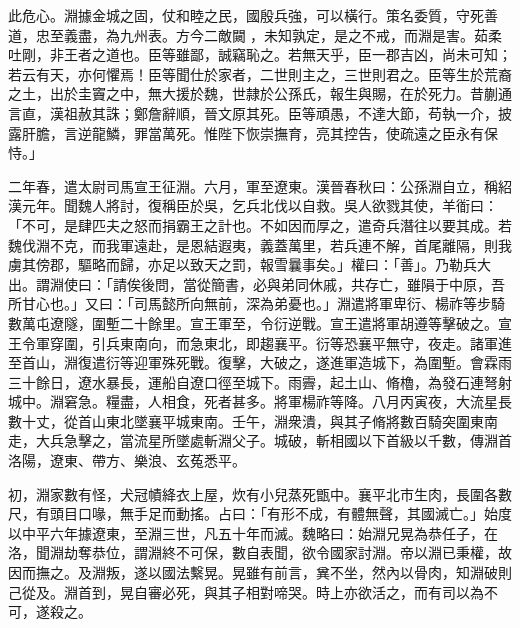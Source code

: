 \begin{pinyinscope}
此危心。淵據金城之固，仗和睦之民，國殷兵強，可以橫行。策名委質，守死善道，忠至義盡，為九州表。方今二敵闚𨵦，未知孰定，是之不戒，而淵是害。茹柔吐剛，非王者之道也。臣等雖鄙，誠竊恥之。若無天乎，臣一郡吉凶，尚未可知；若云有天，亦何懼焉！臣等聞仕於家者，二世則主之，三世則君之。臣等生於荒裔之土，出於圭竇之中，無大援於魏，世隷於公孫氏，報生與賜，在於死力。昔蒯通言直，漢祖赦其誅；鄭詹辭順，晉文原其死。臣等頑愚，不達大節，苟執一介，披露肝膽，言逆龍鱗，罪當萬死。惟陛下恢崇撫育，亮其控告，使疏遠之臣永有保恃。」

二年春，遣太尉司馬宣王征淵。六月，軍至遼東。漢晉春秋曰：公孫淵自立，稱紹漢元年。聞魏人將討，復稱臣於吳，乞兵北伐以自救。吳人欲戮其使，羊衜曰：「不可，是肆匹夫之怒而捐霸王之計也。不如因而厚之，遣奇兵潛往以要其成。若魏伐淵不克，而我軍遠赴，是恩結遐夷，義蓋萬里，若兵連不解，首尾離隔，則我虜其傍郡，驅略而歸，亦足以致天之罰，報雪曩事矣。」權曰：「善」。乃勒兵大出。謂淵使曰：「請俟後問，當從簡書，必與弟同休戚，共存亡，雖隕于中原，吾所甘心也。」又曰：「司馬懿所向無前，深為弟憂也。」淵遣將軍卑衍、楊祚等步騎數萬屯遼隧，圍塹二十餘里。宣王軍至，令衍逆戰。宣王遣將軍胡遵等擊破之。宣王令軍穿圍，引兵東南向，而急東北，即趨襄平。衍等恐襄平無守，夜走。諸軍進至首山，淵復遣衍等迎軍殊死戰。復擊，大破之，遂進軍造城下，為圍塹。會霖雨三十餘日，遼水暴長，運船自遼口徑至城下。雨霽，起土山、脩櫓，為發石連弩射城中。淵窘急。糧盡，人相食，死者甚多。將軍楊祚等降。八月丙寅夜，大流星長數十丈，從首山東北墜襄平城東南。壬午，淵衆潰，與其子脩將數百騎突圍東南走，大兵急擊之，當流星所墜處斬淵父子。城破，斬相國以下首級以千數，傳淵首洛陽，遼東、帶方、樂浪、玄菟悉平。

初，淵家數有怪，犬冠幘絳衣上屋，炊有小兒蒸死甑中。襄平北巿生肉，長圍各數尺，有頭目口喙，無手足而動搖。占曰：「有形不成，有體無聲，其國滅亡。」始度以中平六年據遼東，至淵三世，凡五十年而滅。魏略曰：始淵兄晃為恭任子，在洛，聞淵劫奪恭位，謂淵終不可保，數自表聞，欲令國家討淵。帝以淵已秉權，故因而撫之。及淵叛，遂以國法繫晃。晃雖有前言，兾不坐，然內以骨肉，知淵破則己從及。淵首到，晃自審必死，與其子相對啼哭。時上亦欲活之，而有司以為不可，遂殺之。


\end{pinyinscope}